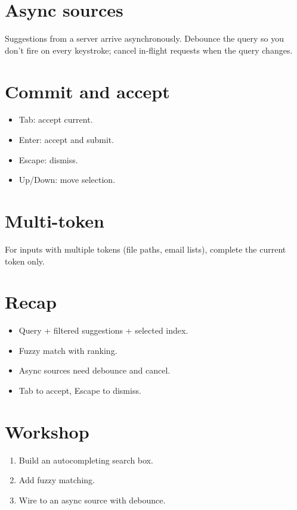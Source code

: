 \section{Async sources}

Suggestions from a server arrive asynchronously. Debounce
the query so you don't fire on every keystroke; cancel
in-flight requests when the query changes.

\section{Commit and accept}

\begin{itemize}[leftmargin=*]
  \item Tab: accept current.
  \item Enter: accept and submit.
  \item Escape: dismiss.
  \item Up/Down: move selection.
\end{itemize}

\section{Multi-token}

For inputs with multiple tokens (file paths, email lists),
complete the current token only.

\section{Recap}

\begin{recap}
\begin{itemize}[leftmargin=*]
  \item Query + filtered suggestions + selected index.
  \item Fuzzy match with ranking.
  \item Async sources need debounce and cancel.
  \item Tab to accept, Escape to dismiss.
\end{itemize}
\end{recap}

\section*{Workshop}

\begin{enumerate}[leftmargin=*]
  \item Build an autocompleting search box.
  \item Add fuzzy matching.
  \item Wire to an async source with debounce.
\end{enumerate}
